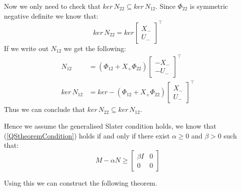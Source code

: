 Now we only need to check that $ker \, N_{22} \subseteq ker \, N_{12}$. Since $\Phi_{22}$ is symmetric negative definite we know that:
\[ ker \, N_{22} = ker \begin{bmatrix} X_- \\ U_- \end{bmatrix}^\top \]
If we write out $N_{12}$ we get the following:
\begin{align*}
	 N_{12} &= (\Phi_{12} + X_+ \Phi_{22}) \begin{bmatrix} -X_- \\ -U_- \end{bmatrix}^\top \\
	 ker \, N_{12} &= ker -(\Phi_{12} + X_+ \Phi_{22}) \begin{bmatrix} X_- \\ U_- \end{bmatrix}^\top
\end{align*}
Thus we can conclude that $ker \, N_{22} \subseteq ker \, N_{12}$. 

Hence we assume the generalised Slater condition holds, we know that (\ref{QStheoremCondition}) holds if and only if there exist $\alpha \geq 0$ and $\beta > 0$ such that:
\begin{equation*}
	M - \alpha N \geq \begin{bmatrix} \beta I & 0 \\ 0 & 0 \end{bmatrix}
\end{equation*}

Using this we can construct the following theorem.

